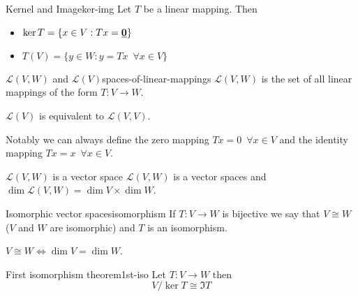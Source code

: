 \documentclass[12pt]{extarticle}
\renewcommand{\vec}[1]{\uvec{#1}}
\begin{document}
\begin{definition}{Kernel and Image}{ker-img}
	Let $T$ be a linear mapping. Then
	\begin{itemize}
		\item $\ker T = \{ x \in V : Tx = \vec 0 \}$
		\item $T(V) = \{ y \in W : y = Tx \enspace \forall x \in V \}$
	\end{itemize}
\end{definition}

\begin{definition}{$\mathscr{L}(V, W)$ and $\mathscr{L}(V)$}{spaces-of-linear-mappings}
	$\mathscr{L}(V, W)$ is the set of all linear mappings of the form $T: V \to W$.

	$\mathscr{L}(V)$ is equivalent to $\mathscr{L}(V, V)$.
\end{definition}

Notably we can always define the zero mapping $Tx = 0 \enspace \forall x \in V$ and the identity mapping $Tx = x \enspace \forall x \in V$.

\begin{theorem}{$\mathscr{L}(V, W)$ is a vector space}{}
	$\mathscr{L}(V, W)$ is a vector spaces and $\dim \mathscr{L}(V, W) = \dim V \times \dim W$.
\end{theorem}

\begin{definition}{Isomorphic vector spaces}{isomorphism}
	If $T: V\to W$ is bijective we say that $V \cong W$ ($V$ and $W$ are isomorphic) and $T$ is an isomorphism.
\end{definition}

\begin{proposition}{}{}
	$V \cong W \iff \dim V = \dim W$.
\end{proposition}

\begin{theorem}{First isomorphism theorem}{1st-iso}
	Let $T: V \to W$ then
	\begin{equation}
		V/\ker T \cong \Im T
	\end{equation}
\end{theorem}
\end{document}
